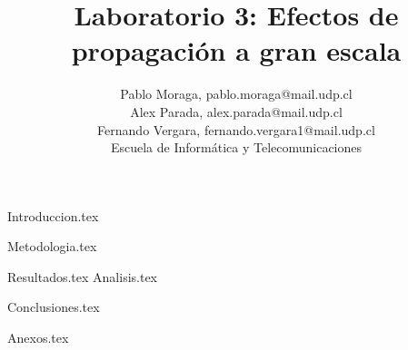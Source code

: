 \documentclass[lettersize,journal]{IEEEtran}
\begin{document}
\title{Laboratorio 3: Efectos de propagación a gran escala }
\author{Pablo Moraga, pablo.moraga@mail.udp.cl  \\
Alex Parada, alex.parada@mail.udp.cl \\
Fernando Vergara, fernando.vergara1@mail.udp.cl \\

Escuela de Informática y Telecomunicaciones \\ 
}



\maketitle

{Introduccion.tex}

{Metodologia.tex}

{Resultados.tex}
{Analisis.tex}


{Conclusiones.tex}

{Anexos.tex}

    

\printbibliography
\end{document}
